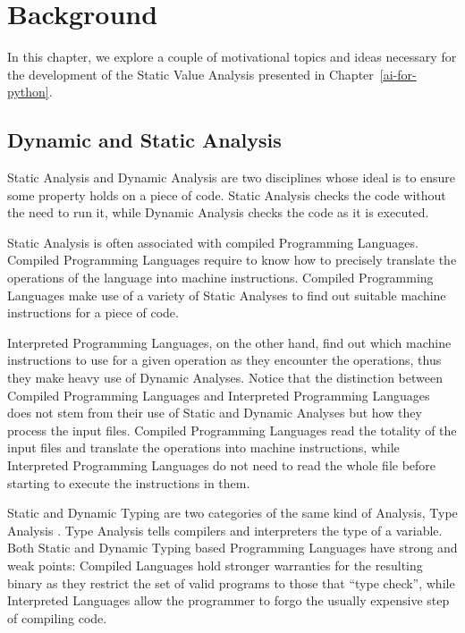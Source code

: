 \chapter{Background}\label{background}

In this chapter, we explore a couple of motivational topics and ideas necessary for the
development of the Static Value Analysis presented in Chapter~\ref{ai-for-python}.

\section{Dynamic and Static Analysis}

Static Analysis and Dynamic Analysis are two disciplines whose ideal is to ensure some
property holds on a piece of code. Static Analysis checks the code without the need to run
it, while Dynamic Analysis checks the code as it is executed.

Static Analysis is often associated with compiled Programming Languages. Compiled
Programming Languages require to know how to precisely translate the operations of the
language into machine instructions. Compiled Programming Languages make use of a variety
of Static Analyses to find out suitable machine instructions for a piece of code.

Interpreted Programming Languages, on the other hand, find out which machine instructions
to use for a given operation as they encounter the operations, thus they make heavy use of
Dynamic Analyses. Notice that the distinction between Compiled Programming Languages and
Interpreted Programming Languages does not stem from their use of Static and Dynamic
Analyses but how they process the input files. Compiled Programming Languages read the
totality of the input files and translate the operations into machine instructions, while
Interpreted Programming Languages do not need to read the whole file before starting to
execute the instructions in them.

Static and Dynamic Typing are two categories of the same kind of Analysis, Type Analysis
\autocite{pierce_types_2002}. Type Analysis tells compilers and interpreters the type of a
variable. Both Static and Dynamic Typing based Programming Languages have strong and weak
points: Compiled Languages hold stronger warranties for the resulting binary as they
restrict the set of valid programs to those that \enquote{type check}, while Interpreted
Languages allow the programmer to forgo the usually expensive step of compiling code.

